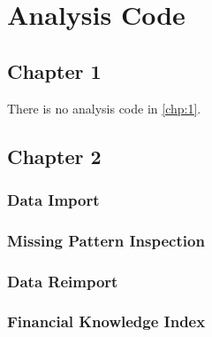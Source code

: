 \chapter{Analysis Code}

\begin{singlespace}

\section{Chapter 1}

There is no analysis code in \cref{chp:1}.

\section{Chapter 2}

\subsection{Data Import} \label{R.import} \footnotesize


\subsection{Missing Pattern Inspection} \label{R.missing} \footnotesize


\subsection{Data Reimport} \label{R.reimport} \footnotesize


\subsection{Financial Knowledge Index} \label{R.fki} \footnotesize


\end{singlespace}
